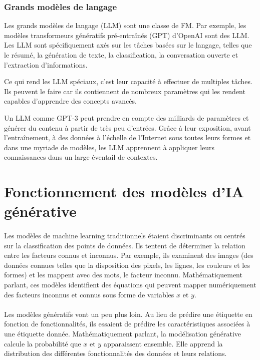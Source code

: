 \subsubsection*{Grands modèles de langage}
Les grands modèles de langage (LLM) sont une classe de FM. Par exemple, les
modèles transformeurs génératifs pré-entraînés (GPT) d'OpenAI sont des LLM. Les LLM
sont spécifiquement axés sur les tâches basées sur le langage, telles que le
résumé, la génération de texte, la classification, la conversation ouverte et l'extraction
d'informations.

Ce qui rend les LLM spéciaux, c'est leur capacité à effectuer de multiples
tâches. Ils peuvent le faire car ils contiennent de nombreux paramètres qui les rendent
capables d'apprendre des concepts avancés.

Un LLM comme GPT-3 peut prendre en compte des milliards de paramètres et générer
du contenu à partir de très peu d'entrées. Grâce à leur exposition, avant l'entraînement,
à des données à l'échelle de l'Internet sous toutes leurs formes et dans une
myriade de modèles, les LLM apprennent à appliquer leurs connaissances dans un large
éventail de contextes.
\section{Fonctionnement des modèles d'IA générative}
\paragraph{}
Les modèles de machine learning traditionnels étaient discriminants ou centrés sur
la classification des points de données. Ils tentent de déterminer la relation
entre les facteurs connus et inconnus. Par exemple, ils examinent des images (des
données connues telles que la disposition des pixels, les lignes, les couleurs et
les formes) et les mappent avec des mots, le facteur inconnu. Mathématiquement
parlant, ces modèles identifient des équations qui peuvent mapper numériquement des
facteurs inconnus et connus sous forme de variables $x$ et $y$.

\paragraph{}
Les modèles génératifs vont un peu plus loin. Au lieu de prédire une étiquette en
fonction de fonctionnalités, ils essaient de prédire les caractéristiques
associées à une étiquette donnée. Mathématiquement parlant, la modélisation
générative calcule la probabilité que $x$ et $y$ apparaissent ensemble. Elle apprend
la distribution des différentes fonctionnalités des données et leurs relations.

